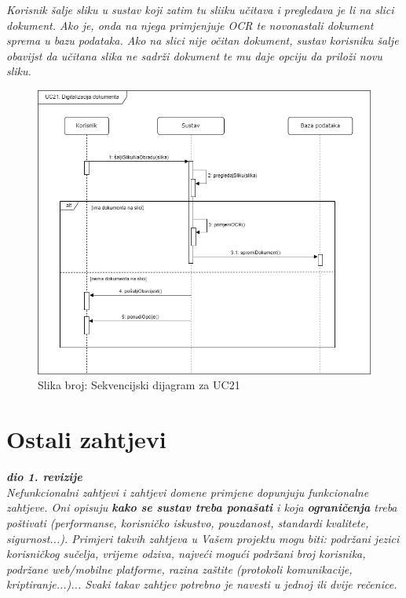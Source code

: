 				\textit{Korisnik šalje sliku  u sustav koji zatim tu sliiku učitava i pregledava je li na slici dokument. Ako je, onda na njega primjenjuje OCR te novonastali dokument sprema u bazu podataka. Ako na slici nije očitan dokument, sustav korisniku šalje obavijst da učitana slika ne sadrži dokument te mu daje opciju da priloži novu sliku.}
				\begin{figure}[H]
					\includegraphics[width=\textwidth]{slike/sekvencijski_dijagram_UC21.PNG} %
					\caption{Slika broj: Sekvencijski dijagram za UC21}
					\label{fig:UC21} %
				\end{figure}		
				\clearpage

				\eject
	
		\section{Ostali zahtjevi}
		
			\textbf{\textit{dio 1. revizije}}\\
		 
			 \textit{Nefunkcionalni zahtjevi i zahtjevi domene primjene dopunjuju funkcionalne zahtjeve. Oni opisuju \textbf{kako se sustav treba ponašati} i koja \textbf{ograničenja} treba poštivati (performanse, korisničko iskustvo, pouzdanost, standardi kvalitete, sigurnost...). Primjeri takvih zahtjeva u Vašem projektu mogu biti: podržani jezici korisničkog sučelja, vrijeme odziva, najveći mogući podržani broj korisnika, podržane web/mobilne platforme, razina zaštite (protokoli komunikacije, kriptiranje...)... Svaki takav zahtjev potrebno je navesti u jednoj ili dvije rečenice.}
			 
			 
			 
	